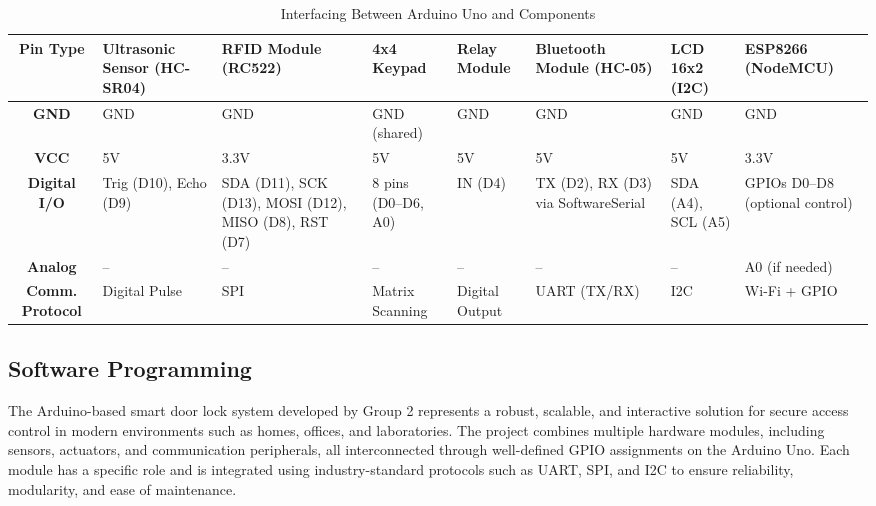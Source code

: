 \documentclass[conference, onecolumn]{IEEEtran}
\begin{document}
\begin{table}[htb]
	\caption{Interfacing Between Arduino Uno and Components}
	\label{tab:interface_table}
	\centering
	\scriptsize
	\renewcommand{\arraystretch}{1.4}
	\begin{adjustbox}{max width=0.98\textwidth}
		\begin{tabular}{|c|p{2.3cm}|p{2.3cm}|p{2.3cm}|p{2.3cm}|p{2.3cm}|p{2.3cm}|p{2.3cm}|}
			\hline
			\textbf{Pin Type} & \textbf{Ultrasonic Sensor (HC-SR04)} & \textbf{RFID Module (RC522)} & \textbf{4x4 Keypad} & \textbf{Relay Module} & \textbf{Bluetooth Module (HC-05)} & \textbf{LCD 16x2 (I2C)} & \textbf{ESP8266 (NodeMCU)} \\
			\hline
			\textbf{GND} & GND & GND & GND (shared) & GND & GND & GND & GND \\
			\hline
			\textbf{VCC} & 5V & 3.3V & 5V & 5V & 5V & 5V & 3.3V \\
			\hline
			\textbf{Digital I/O} & Trig (D10), Echo (D9) & 
			SDA (D11), SCK (D13), MOSI (D12), MISO (D8), RST (D7) & 
			8 pins (D0–D6, A0) & 
			IN (D4) & 
			TX (D2), RX (D3) via SoftwareSerial & 
			SDA (A4), SCL (A5) & 
			GPIOs D0–D8 (optional control) \\
			\hline
			\textbf{Analog} & – & – & – & – & – & – & A0 (if needed) \\
			\hline
			\textbf{Comm. Protocol} & Digital Pulse & SPI & Matrix Scanning & Digital Output & UART (TX/RX) & I2C & Wi-Fi + GPIO \\
			\hline
		\end{tabular}
	\end{adjustbox}
\end{table}


\subsection{Software Programming}

The Arduino-based smart door lock system developed by Group 2 represents a robust, scalable, and interactive solution for secure access control in modern environments such as homes, offices, and laboratories. The project combines multiple hardware modules, including sensors, actuators, and communication peripherals, all interconnected through well-defined GPIO assignments on the Arduino Uno. Each module has a specific role and is integrated using industry-standard protocols such as UART, SPI, and I2C to ensure reliability, modularity, and ease of maintenance.
\end{document}
